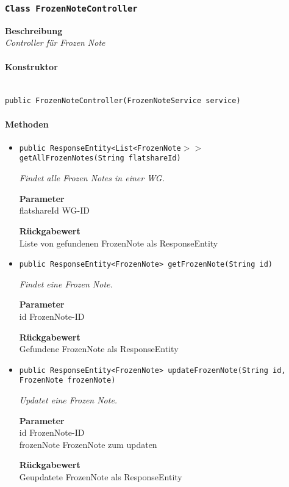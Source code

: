      \subsubsection{\texttt{Class FrozenNoteController}}
     \textbf{Beschreibung} \\
     \textit{Controller für Frozen Note}
     \paragraph*{Konstruktor}\mbox{} \\
     \texttt{public FrozenNoteController(FrozenNoteService service)} \\
     \paragraph*{Methoden}
     \begin{itemize}
     	\item{\texttt{public ResponseEntity<List<FrozenNote$>>$ getAllFrozenNotes(String flatshareId)}}
     	
     	\textit{Findet alle Frozen Notes in einer WG.}
     	
     	\textbf{Parameter} \\
     	flatshareId WG-ID
     	
     	\textbf{Rückgabewert} \\
     	Liste von gefundenen FrozenNote als ResponseEntity        \item{\texttt{public ResponseEntity<FrozenNote> getFrozenNote(String id)}}
     	
     	\textit{Findet eine Frozen Note.}
     	
     	\textbf{Parameter} \\
     	id FrozenNote-ID
     	
     	\textbf{Rückgabewert} \\
     	Gefundene FrozenNote als ResponseEntity        \item{\texttt{public ResponseEntity<FrozenNote> updateFrozenNote(String id, FrozenNote frozenNote)}}
     	
     	\textit{Updatet eine Frozen Note.}
     	
     	\textbf{Parameter} \\
     	id FrozenNote-ID\\
     	frozenNote FrozenNote zum updaten
     	
     	\textbf{Rückgabewert} \\
     	Geupdatete FrozenNote als ResponseEntity
     \end{itemize}
